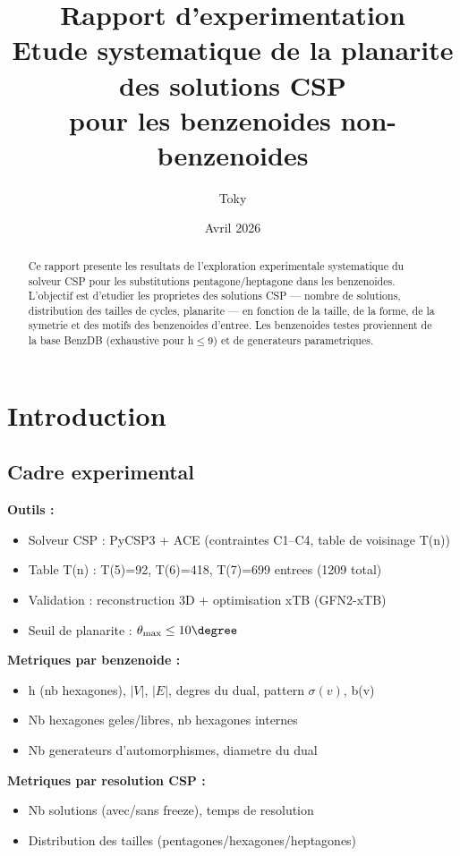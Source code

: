 \documentclass[a4paper,11pt]{article}
\title{Rapport d'experimentation\\
\large Etude systematique de la planarite des solutions CSP\\
pour les benzenoides non-benzenoides}
\author{Toky}
\date{Avril 2026}
\begin{document}
\maketitle

\begin{abstract}
Ce rapport presente les resultats de l'exploration experimentale systematique
du solveur CSP pour les substitutions pentagone/heptagone dans les benzenoides.
L'objectif est d'etudier les proprietes des solutions CSP --- nombre de solutions,
distribution des tailles de cycles, planarite --- en fonction de la taille, de la forme,
de la symetrie et des motifs des benzenoides d'entree. Les benzenoides testes proviennent
de la base BenzDB (exhaustive pour h$\leq$9) et de generateurs parametriques.
\end{abstract}

\tableofcontents
\newpage

\section{Introduction}

\subsection{Cadre experimental}

\textbf{Outils :}
\begin{itemize}
    \item Solveur CSP : PyCSP3 + ACE (contraintes C1--C4, table de voisinage T(n))
    \item Table T(n) : T(5)=92, T(6)=418, T(7)=699 entrees (1209 total)
    \item Validation : reconstruction 3D + optimisation xTB (GFN2-xTB)
    \item Seuil de planarite : $\theta_{\max} \leq 10\degree$
\end{itemize}

\textbf{Metriques par benzenoide :}
\begin{itemize}
    \item h (nb hexagones), $|V|$, $|E|$, degres du dual, pattern $\sigma(v)$, b(v)
    \item Nb hexagones geles/libres, nb hexagones internes
    \item Nb generateurs d'automorphismes, diametre du dual
\end{itemize}

\textbf{Metriques par resolution CSP :}
\begin{itemize}
    \item Nb solutions (avec/sans freeze), temps de resolution
    \item Distribution des tailles (pentagones/hexagones/heptagones)
\end{itemize}
\end{document}
